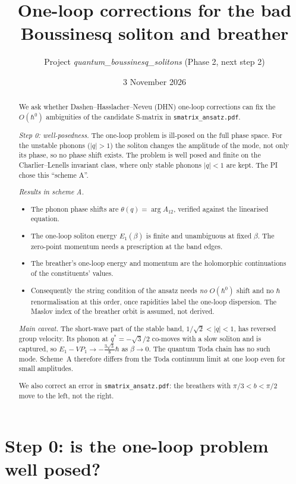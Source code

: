 \documentclass[11pt,a4paper]{article}
\title{One-loop corrections for the bad Boussinesq soliton and breather}
\author{Project \emph{quantum\_boussinesq\_solitons} (Phase 2, next step 2)}
\date{3 November 2026}
\theoremstyle{remark}\newtheorem{remark}[proposition]{Remark}
\begin{document}
\maketitle

\begin{abstract}
We ask whether Dashen--Hasslacher--Neveu (DHN) one-loop corrections can fix the $O(\hbar^0)$ ambiguities of the candidate S-matrix in \texttt{smatrix\_ansatz.pdf}.

\emph{Step 0: well-posedness.} The one-loop problem is ill-posed on the full phase space. For the unstable phonons ($|q|>1$) the soliton changes the amplitude of the mode, not only its phase, so no phase shift exists. The problem is well posed and finite on the Charlier--Lenells invariant class, where only stable phonons $|q|<1$ are kept. The PI chose this ``scheme A''.

\emph{Results in scheme A.}
\begin{itemize}
\item The phonon phase shifts are $\theta(q)=\arg A_{12}$, verified against the linearised equation.
\item The one-loop soliton energy $E_1(\beta)$ is finite and unambiguous at fixed $\beta$. The zero-point momentum needs a prescription at the band edges.
\item The breather's one-loop energy and momentum are the holomorphic continuations of the constituents' values.
\item Consequently the string condition of the ansatz needs \emph{no} $O(\hbar^0)$ shift and no $\hbar$ renormalisation at this order, once rapidities label the one-loop dispersion. The Maslov index of the breather orbit is assumed, not derived.
\end{itemize}

\emph{Main caveat.} The short-wave part of the stable band, $1/\sqrt2<|q|<1$, has reversed group velocity. Its phonon at $q^*=-\sqrt3/2$ co-moves with a slow soliton and is captured, so $E_1-VP_1\to-\tfrac{3\sqrt3}8\hbar$ as $\beta\to0$. The quantum Toda chain has no such mode. Scheme~A therefore differs from the Toda continuum limit at one loop even for small amplitudes.

We also correct an error in \texttt{smatrix\_ansatz.pdf}: the breathers with $\pi/3<b<\pi/2$ move to the left, not the right.
\end{abstract}
\tableofcontents

\section{Step 0: is the one-loop problem well posed?}
\end{document}
